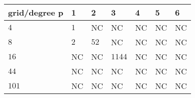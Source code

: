 \begin{tabular}{lllllll}
\hline
 grid/degree p   & 1   & 2    & 3      & 4   & 5   & 6   \\
\hline
 $4$             & $1$ & NC   & NC     & NC  & NC  & NC  \\
 $8$             & $2$ & $52$ & NC     & NC  & NC  & NC  \\
 $16$            & NC  & NC   & $1144$ & NC  & NC  & NC  \\
 $44$            & NC  & NC   & NC     & NC  & NC  & NC  \\
 $101$           & NC  & NC   & NC     & NC  & NC  & NC  \\
\hline
\end{tabular}